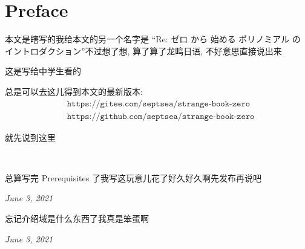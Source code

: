 \section*{Preface}

本文是瞎写的\period 我给本文的另一个名字是 ``Re: ゼロ から 始める ポリノミアル の イントロダクション''\period 不过想了想, 算了算了\period 龙鸣日语, 不好意思直接说出来\period

这是写给中学生看的\period

总是可以去这儿得到本文的最新版本:
\begin{align*}
    & \texttt{https://gitee.com/septsea/strange-book-zero} \\
    & \texttt{https://github.com/septsea/strange-book-zero}
\end{align*}

就先说到这里\period

\ \

\providecommand{\appendDate}{}
\renewcommand{\appendDate}[1]{\par \hfill {\itshape \sffamily #1}}

\begin{remark}
    总算写完 Prerequisites 了\period 我写这玩意儿花了好久好久啊\period 先发布再说吧\period
    \appendDate{June 3, 2021}
\end{remark}

\begin{remark}
    忘记介绍域是什么东西了\period 我真是笨蛋啊\period
    \appendDate{June 3, 2021}
\end{remark}
